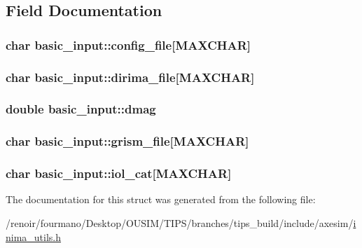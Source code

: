 \subsection{Field Documentation}
\hypertarget{structbasic__input_ae727f03bb293ff762d591d577d08f9c4}{
\subsubsection[{config\_\-file}]{\setlength{\rightskip}{0pt plus 5cm}char {\bf basic\_\-input::config\_\-file}\mbox{[}MAXCHAR\mbox{]}}}
\label{structbasic__input_ae727f03bb293ff762d591d577d08f9c4}
\hypertarget{structbasic__input_a7abc1ca0b2f0e2baa263a5cd29015ded}{
\subsubsection[{dirima\_\-file}]{\setlength{\rightskip}{0pt plus 5cm}char {\bf basic\_\-input::dirima\_\-file}\mbox{[}MAXCHAR\mbox{]}}}
\label{structbasic__input_a7abc1ca0b2f0e2baa263a5cd29015ded}
\hypertarget{structbasic__input_af35e90aa0f78ac5e17303fcd332f1423}{
\subsubsection[{dmag}]{\setlength{\rightskip}{0pt plus 5cm}double {\bf basic\_\-input::dmag}}}
\label{structbasic__input_af35e90aa0f78ac5e17303fcd332f1423}
\hypertarget{structbasic__input_a051fdba94c858cc9fb7e8fc53aa0cef3}{
\subsubsection[{grism\_\-file}]{\setlength{\rightskip}{0pt plus 5cm}char {\bf basic\_\-input::grism\_\-file}\mbox{[}MAXCHAR\mbox{]}}}
\label{structbasic__input_a051fdba94c858cc9fb7e8fc53aa0cef3}
\hypertarget{structbasic__input_aa59577abc77308875fd9a0e102a2bbb2}{
\subsubsection[{iol\_\-cat}]{\setlength{\rightskip}{0pt plus 5cm}char {\bf basic\_\-input::iol\_\-cat}\mbox{[}MAXCHAR\mbox{]}}}
\label{structbasic__input_aa59577abc77308875fd9a0e102a2bbb2}


The documentation for this struct was generated from the following file:\begin{DoxyCompactItemize}
\item 
/renoir/fourmano/Desktop/OUSIM/TIPS/branches/tips\_\-build/include/axesim/\hyperlink{inima__utils_8h}{inima\_\-utils.h}\end{DoxyCompactItemize}
